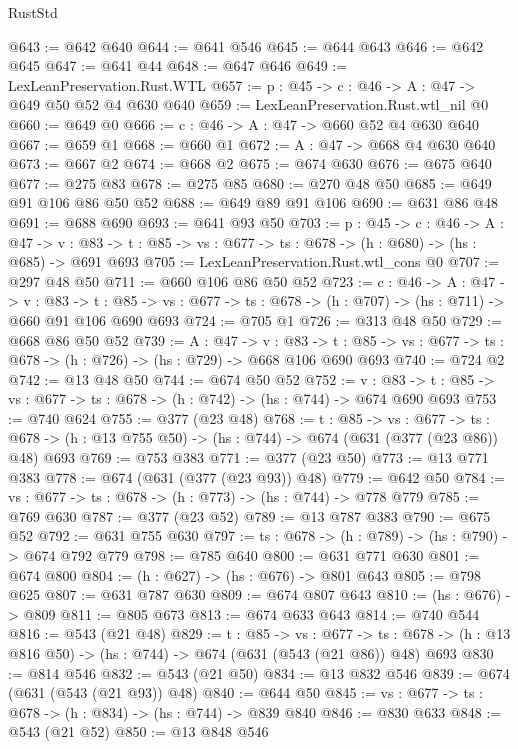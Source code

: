 \begin{lexlean}{RustStd}
\begin{coremodule}
@643 := @642 @640
@644 := @641 @546
@645 := @644 @643
@646 := @642 @645
@647 := @641 @44
@648 := @647 @646
@649 := LexLeanPreservation.Rust.WTL
@657 := {p : @45} -> {c : @46} -> {A : @47} -> @649 @50 @52 @4 @630 @640
@659 := LexLeanPreservation.Rust.wtl_nil @0
@660 := @649 @0
@666 := {c : @46} -> {A : @47} -> @660 @52 @4 @630 @640
@667 := @659 @1
@668 := @660 @1
@672 := {A : @47} -> @668 @4 @630 @640
@673 := @667 @2
@674 := @668 @2
@675 := @674 @630
@676 := @675 @640
@677 := @275 @83
@678 := @275 @85
@680 := @270 @48 @50
@685 := @649 @91 @106 @86 @50 @52
@688 := @649 @89 @91 @106
@690 := @631 @86 @48
@691 := @688 @690
@693 := @641 @93 @50
@703 := {p : @45} ->
  {c : @46} ->
  {A : @47} ->
  {v : @83} -> {t : @85} -> {vs : @677} -> {ts : @678} -> (h : @680) -> (hs : @685) -> @691 @693
@705 := LexLeanPreservation.Rust.wtl_cons @0
@707 := @297 @48 @50
@711 := @660 @106 @86 @50 @52
@723 := {c : @46} ->
  {A : @47} ->
  {v : @83} ->
  {t : @85} -> {vs : @677} -> {ts : @678} -> (h : @707) -> (hs : @711) -> @660 @91 @106 @690 @693
@724 := @705 @1
@726 := @313 @48 @50
@729 := @668 @86 @50 @52
@739 := {A : @47} ->
  {v : @83} ->
  {t : @85} -> {vs : @677} -> {ts : @678} -> (h : @726) -> (hs : @729) -> @668 @106 @690 @693
@740 := @724 @2
@742 := @13 @48 @50
@744 := @674 @50 @52
@752 := {v : @83} ->
  {t : @85} -> {vs : @677} -> {ts : @678} -> (h : @742) -> (hs : @744) -> @674 @690 @693
@753 := @740 @624
@755 := @377 (@23 @48)
@768 := {t : @85} ->
  {vs : @677} ->
  {ts : @678} -> (h : @13 @755 @50) -> (hs : @744) -> @674 (@631 (@377 (@23 @86)) @48) @693
@769 := @753 @383
@771 := @377 (@23 @50)
@773 := @13 @771 @383
@778 := @674 (@631 (@377 (@23 @93)) @48)
@779 := @642 @50
@784 := {vs : @677} -> {ts : @678} -> (h : @773) -> (hs : @744) -> @778 @779
@785 := @769 @630
@787 := @377 (@23 @52)
@789 := @13 @787 @383
@790 := @675 @52
@792 := @631 @755 @630
@797 := {ts : @678} -> (h : @789) -> (hs : @790) -> @674 @792 @779
@798 := @785 @640
@800 := @631 @771 @630
@801 := @674 @800
@804 := (h : @627) -> (hs : @676) -> @801 @643
@805 := @798 @625
@807 := @631 @787 @630
@809 := @674 @807 @643
@810 := (hs : @676) -> @809
@811 := @805 @673
@813 := @674 @633 @643
@814 := @740 @544
@816 := @543 (@21 @48)
@829 := {t : @85} ->
  {vs : @677} ->
  {ts : @678} -> (h : @13 @816 @50) -> (hs : @744) -> @674 (@631 (@543 (@21 @86)) @48) @693
@830 := @814 @546
@832 := @543 (@21 @50)
@834 := @13 @832 @546
@839 := @674 (@631 (@543 (@21 @93)) @48)
@840 := @644 @50
@845 := {vs : @677} -> {ts : @678} -> (h : @834) -> (hs : @744) -> @839 @840
@846 := @830 @633
@848 := @543 (@21 @52)
@850 := @13 @848 @546

\end{coremodule}
\end{lexlean}
